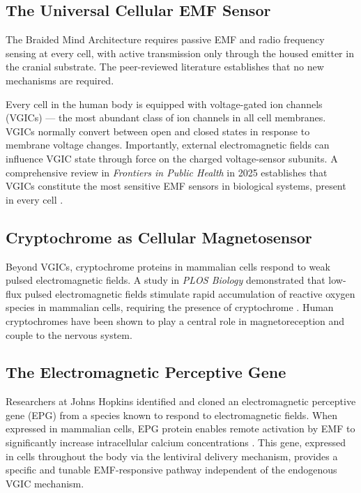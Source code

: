 \documentclass[12pt]{article}
\begin{document}
\subsection{The Universal Cellular EMF Sensor}

The Braided Mind Architecture requires passive EMF and radio frequency sensing at every cell, with active transmission only through the housed emitter in the cranial substrate. The peer-reviewed literature establishes that no new mechanisms are required.

Every cell in the human body is equipped with voltage-gated ion channels (VGICs) --- the most abundant class of ion channels in all cell membranes. VGICs normally convert between open and closed states in response to membrane voltage changes. Importantly, external electromagnetic fields can influence VGIC state through force on the charged voltage-sensor subunits. A comprehensive review in \textit{Frontiers in Public Health} in 2025 establishes that VGICs constitute the most sensitive EMF sensors in biological systems, present in every cell \cite{vgic_emf_2025}.

\subsection{Cryptochrome as Cellular Magnetosensor}

Beyond VGICs, cryptochrome proteins in mammalian cells respond to weak pulsed electromagnetic fields. A study in \textit{PLOS Biology} demonstrated that low-flux pulsed electromagnetic fields stimulate rapid accumulation of reactive oxygen species in mammalian cells, requiring the presence of cryptochrome \cite{cryptochrome_emf_2018}. Human cryptochromes have been shown to play a central role in magnetoreception and couple to the nervous system.

\subsection{The Electromagnetic Perceptive Gene}

Researchers at Johns Hopkins identified and cloned an electromagnetic perceptive gene (EPG) from a species known to respond to electromagnetic fields. When expressed in mammalian cells, EPG protein enables remote activation by EMF to significantly increase intracellular calcium concentrations \cite{epg_wireless_2018}. This gene, expressed in cells throughout the body via the lentiviral delivery mechanism, provides a specific and tunable EMF-responsive pathway independent of the endogenous VGIC mechanism.
\end{document}
